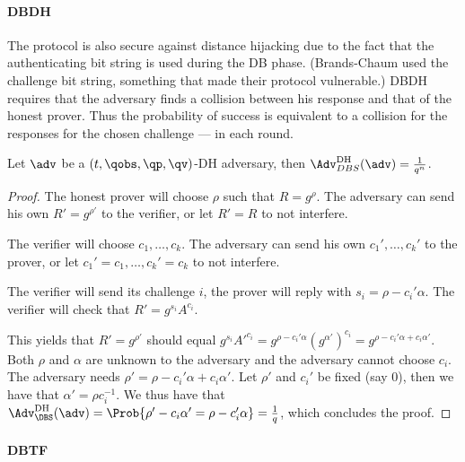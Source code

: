 \paragraph{\Acl{DBDH}}

The protocol is also secure against distance hijacking due to the fact that the 
authenticating bit string is used during the \ac{DB} phase.
(Brands-Chaum used the challenge bit string, something that made their protocol 
vulnerable.)
\Ac{DBDH} requires that the adversary finds a collision between his response 
and that of the honest prover.
Thus the probability of success is equivalent to a collision for the responses 
for the chosen challenge --- in each round.

\begin{theorem}
  Let \(\adv\) be a \((t, \qobs, \qp, \qv)\)-DH adversary, then 
  \(\Adv_{DBS}^{\text{DH}}(\adv) = \frac{1}{q^n}\).
\end{theorem}

\begin{proof}
  The honest prover will choose \(\rho\) such that \(R = g^\rho\).
  The adversary can send his own \(R' = g^{\rho'}\) to the verifier, or let 
  \(R' = R\) to not interfere.

  The verifier will choose \(c_1, \dotsc, c_k\).
  The adversary can send his own \(c_1', \dotsc, c_k'\) to the prover, or let 
  \(c_1' = c_1, \dotsc, c_k' = c_k\) to not interfere.

  The verifier will send its challenge \(i\), the prover will reply with \(s_i 
    = \rho - c_i' \alpha\).
  The verifier will check that \(R' = g^{s_i} A^{c_i}\).

  This yields that \(R' = g^{\rho'}\) should equal \(g^{s_i} A'^{c_i} = g^{\rho 
      - c_i' \alpha} (g^{\alpha'})^{c_i} = g^{\rho - c_i' \alpha + c_i 
      \alpha'}\).
  Both \(\rho\) and \(\alpha\) are unknown to the adversary and the adversary 
  cannot choose \(c_i\).
  The adversary needs \(\rho' = \rho - c_i' \alpha + c_i \alpha'\).
  Let \(\rho'\) and \(c_i'\) be fixed (say 0), then we have that \(\alpha' = 
    \rho c_i^{-1}\).
  We thus have that
  \(\Adv_{\DBS}^{\text{DH}}(\adv) = \Prob{\rho' - c_i \alpha' = \rho - c_i' 
      \alpha} = \frac{1}{q}\),
  which concludes the proof.
\end{proof}

\paragraph{\Acl{DBTF}}

